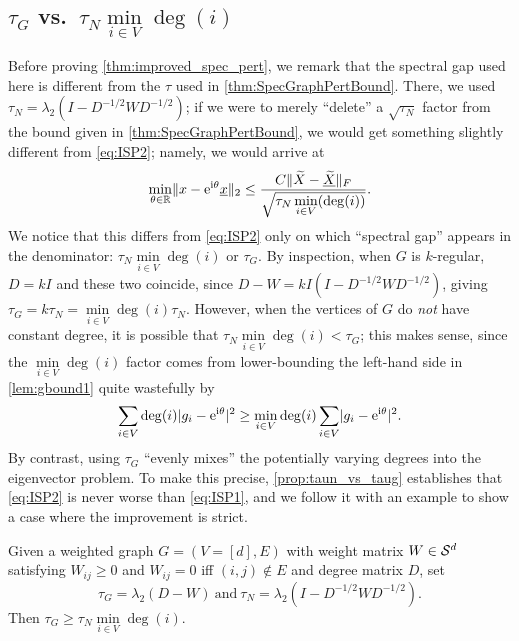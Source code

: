 \subsection{$\tau_G$ vs.~$\tau_N \min\limits_{i \in V} \deg(i)$}
Before proving \cref{thm:improved_spec_pert}, we remark that the spectral gap used here is different from the $\tau$ used in \cref{thm:SpecGraphPertBound}.  There, we used $\tau_N = \lambda_2(I - D^{-1/2} W D^{-1/2})$; if we were to merely ``delete'' a $\sqrt{\tau_N}$ factor from the bound given in \cref{thm:SpecGraphPertBound}, we would get something slightly different from \eqref{eq:ISP2}; namely, we would arrive at \begin{equation} \min_{\theta \in \mathbb{R}} \lVert x - \mathrm{e}^{\mathrm{i} \theta} \underline{x} \rVert_2 \le \dfrac{C \lVert \widetilde{X} - \underline{\widetilde{X}} \rVert_F}{\sqrt{\tau_N \min\limits_{i \in V}(\deg(i))}}.\label{eq:ISP1}\end{equation}  We notice that this differs from \eqref{eq:ISP2} only on which ``spectral gap'' appears in the denominator: $\tau_N \min\limits_{i \in V} \deg(i)$ or $\tau_G$.  By inspection, when $G$ is $k$-regular, $D = k I$ and these two coincide, since $D - W = kI (I - D^{-1/2} W D^{-1/2})$, giving $\tau_G = k \tau_N = \min\limits_{i \in V}\deg(i) \tau_N$.  However, when the vertices of $G$ do \emph{not} have constant degree, it is possible that $\tau_N \min\limits_{i \in V} \deg(i) < \tau_G$; this makes sense, since the $\min\limits_{i \in V}\deg(i)$ factor comes from lower-bounding the left-hand side in \cref{lem:gbound1} quite wastefully by \[\sum_{i \in V} \deg(i) \lvert g_i - \mathrm{e}^{\mathrm{i} \theta}\rvert^2 \ge \min_{i \in V} \deg(i) \sum_{i \in V} \lvert g_i - \mathrm{e}^{\mathrm{i} \theta}\rvert^2.\]  By contrast, using $\tau_G$ ``evenly mixes'' the potentially varying degrees into the eigenvector problem.  To make this precise, \cref{prop:taun_vs_taug} establishes that \eqref{eq:ISP2} is never worse than \eqref{eq:ISP1}, and we follow it with an example to show a case where the improvement is strict.

\begin{proposition}
  Given a weighted graph $G = (V = [d], E)$ with weight matrix $W \in \mathcal{S}^d$ satisfying $W_{ij} \ge 0$ and $W_{ij} = 0$ iff $(i, j) \notin E$ and degree matrix $D$, set \[\tau_G = \lambda_2(D - W) \ \text{and} \ \tau_N = \lambda_2(I - D^{-1/2} W D^{-1/2}).\]  Then $\tau_G \ge \tau_N \min\limits_{i \in V} \deg(i)$.
  \label{prop:taun_vs_taug}
\end{proposition}

